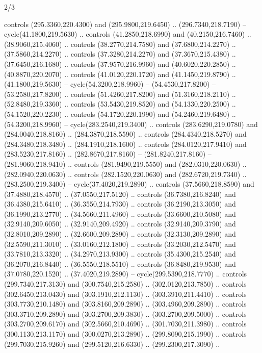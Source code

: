 \begin{flagdescription}{2/3}
\begin{scope}[xshift=0.5\flaglength,yshift=0.5\flagwidth,scale=\stretchfactor]
\begin{scope}[scale=0.001645\flagwidth,yshift=65mm,xshift=-63mm]
\begin{scope}[y=0.80pt, x=0.80pt, yscale=-1,]
\begin{scope}[cm={{1.33333,0.0,0.0,1.33333,(0.0,1e-05)}}]
  controls (295.3360,220.4300) and (295.9800,219.6450) .. (296.7340,218.7190) --
  cycle(41.1800,219.5630) .. controls (41.2850,218.6990) and (40.2150,216.7460)
  .. (38.9060,215.4060) .. controls (38.2770,214.7580) and (37.6800,214.2270) ..
  (37.5860,214.2270) .. controls (37.3280,214.2270) and (37.3670,215.4380) ..
  (37.6450,216.1680) .. controls (37.9570,216.9960) and (40.6020,220.2850) ..
  (40.8870,220.2070) .. controls (41.0120,220.1720) and (41.1450,219.8790) ..
  (41.1800,219.5630) -- cycle(54.3200,218.9960) -- (54.4530,217.8200) --
  (53.2580,217.8200) .. controls (51.4260,217.8200) and (51.3160,218.2110) ..
  (52.8480,219.3360) .. controls (53.5430,219.8520) and (54.1330,220.2500) ..
  (54.1520,220.2230) .. controls (54.1720,220.1990) and (54.2460,219.6480) ..
  (54.3200,218.9960) -- cycle(283.2540,219.3400) .. controls (283.6290,219.0780)
  and (284.0040,218.8160) .. (284.3870,218.5590) .. controls (284.4340,218.5270)
  and (284.3480,218.3480) .. (284.1910,218.1600) .. controls (284.0120,217.9410)
  and (283.5230,217.8160) .. (282.8670,217.8160) -- (281.8240,217.8160) --
  (281.9060,218.9410) .. controls (281.9490,219.5550) and (282.0310,220.0630) ..
  (282.0940,220.0630) .. controls (282.1520,220.0630) and (282.6720,219.7340) ..
  (283.2500,219.3400) -- cycle(37.4020,219.2890) .. controls (37.5660,218.8590)
  and (37.4880,218.4570) .. (37.0550,217.5120) .. controls (36.7380,216.8240)
  and (36.4380,215.6410) .. (36.3550,214.7930) .. controls (36.2190,213.3050)
  and (36.1990,213.2770) .. (34.5660,211.4960) .. controls (33.6600,210.5080)
  and (32.9140,209.6050) .. (32.9140,209.4920) .. controls (32.9140,209.3790)
  and (32.8010,209.2890) .. (32.6600,209.2890) .. controls (32.3130,209.2890)
  and (32.5590,211.3010) .. (33.0160,212.1800) .. controls (33.2030,212.5470)
  and (33.7810,213.3320) .. (34.2970,213.9300) .. controls (35.4300,215.2540)
  and (36.2070,216.8440) .. (36.5550,218.5510) .. controls (36.8480,219.9530)
  and (37.0780,220.1520) .. (37.4020,219.2890) -- cycle(299.5390,218.7770) ..
  controls (299.7340,217.3130) and (300.7540,215.2580) .. (302.0120,213.7850) ..
  controls (302.6450,213.0430) and (303.1910,212.1130) .. (303.3910,211.4410) ..
  controls (303.7730,210.1480) and (303.8160,209.2890) .. (303.4960,209.2890) ..
  controls (303.3710,209.2890) and (303.2700,209.3830) .. (303.2700,209.5000) ..
  controls (303.2700,209.6170) and (302.5660,210.4690) .. (301.7030,211.3980) ..
  controls (300.1130,213.1170) and (300.0270,213.2890) .. (299.8090,215.1990) ..
  controls (299.7030,215.9260) and (299.5120,216.6330) .. (299.2300,217.3090) ..

\end{scope}
\end{scope}
\end{scope}
\end{scope}
\end{flagdescription}
